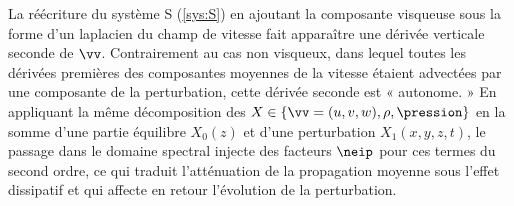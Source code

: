 La réécriture du système S (\ref{sys:S}) en ajoutant la composante visqueuse sous la forme d'un laplacien du champ de vitesse fait apparaître une dérivée verticale seconde de $\vv$. Contrairement au cas non visqueux, dans lequel toutes les dérivées premières des composantes moyennes de la vitesse étaient advectées par une composante de la perturbation, cette dérivée seconde est « autonome. » En appliquant la même décomposition des $X \in \{ \vv = (u, v, w), \rho, \pression \}$ en la somme d'une partie équilibre $X_0(z)$ et d'une perturbation $X_1(x,y,z,t)$, le passage dans le domaine spectral injecte des facteurs $\neip$ pour ces termes du second ordre, ce qui traduit l'atténuation de la propagation moyenne sous l'effet dissipatif et qui affecte en retour l'évolution de la perturbation.
